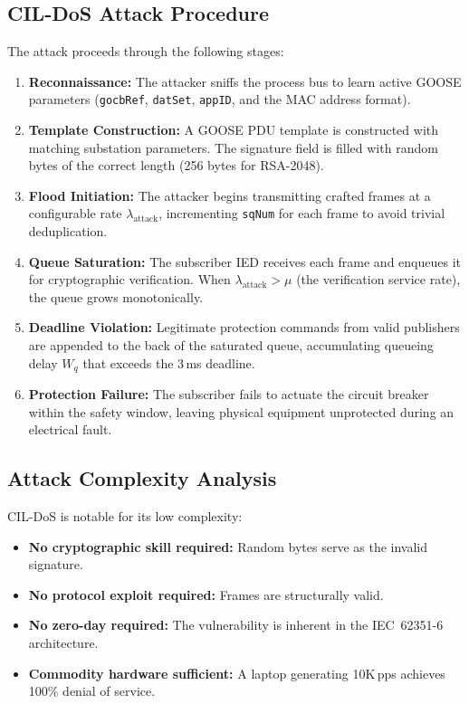 \documentclass{ieeeaccess}
\begin{document}
\subsection{CIL-DoS Attack Procedure}
The attack proceeds through the following stages:
\begin{enumerate}[leftmargin=*]
    \item \textbf{Reconnaissance:} The attacker sniffs the process bus to learn active GOOSE parameters (\texttt{gocbRef}, \texttt{datSet}, \texttt{appID}, and the MAC address format).
    \item \textbf{Template Construction:} A GOOSE PDU template is constructed with matching substation parameters. The signature field is filled with random bytes of the correct length (256 bytes for RSA-2048).
    \item \textbf{Flood Initiation:} The attacker begins transmitting crafted frames at a configurable rate $\lambda_{\text{attack}}$, incrementing \texttt{sqNum} for each frame to avoid trivial deduplication.
    \item \textbf{Queue Saturation:} The subscriber IED receives each frame and enqueues it for cryptographic verification. When $\lambda_{\text{attack}} > \mu$ (the verification service rate), the queue grows monotonically.
    \item \textbf{Deadline Violation:} Legitimate protection commands from valid publishers are appended to the back of the saturated queue, accumulating queueing delay $W_q$ that exceeds the 3\,ms deadline.
    \item \textbf{Protection Failure:} The subscriber fails to actuate the circuit breaker within the safety window, leaving physical equipment unprotected during an electrical fault.
\end{enumerate}

\subsection{Attack Complexity Analysis}
CIL-DoS is notable for its low complexity:
\begin{itemize}[leftmargin=*]
    \item \textbf{No cryptographic skill required:} Random bytes serve as the invalid signature.
    \item \textbf{No protocol exploit required:} Frames are structurally valid.
    \item \textbf{No zero-day required:} The vulnerability is inherent in the IEC~62351-6 architecture.
    \item \textbf{Commodity hardware sufficient:} A laptop generating 10K\,pps achieves 100\% denial of service.
\end{itemize}
\end{document}
